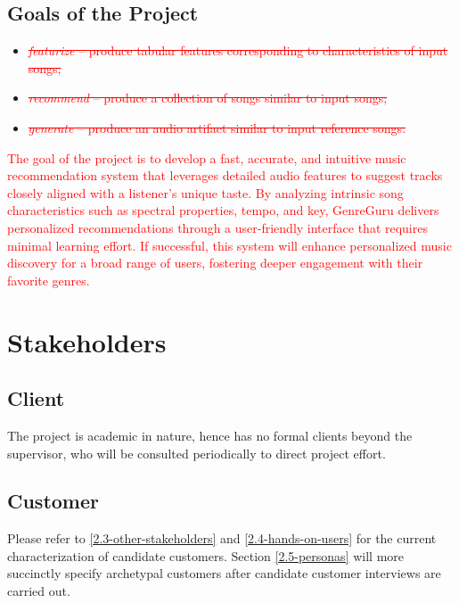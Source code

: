\documentclass[12pt]{article}
\begin{document}
\subsection{Goals of the Project}

\begin{itemize}
  \item \textcolor{red}{\sout{\emph{featurize} -- produce tabular features corresponding to characteristics of input songs;}}
  \item \textcolor{red}{\sout{\emph{recommend} -- produce a collection of songs similar to input songs;}}
  \item \textcolor{red}{\sout{\emph{generate} -- produce an audio artifact similar to input reference songs.}}  
\end{itemize}


\textcolor{red}{The goal of the project is to develop a fast, accurate, and intuitive music recommendation system that leverages detailed audio features to suggest 
tracks closely aligned with a listener’s unique taste. By analyzing intrinsic song characteristics such as spectral properties, tempo, and key, 
GenreGuru delivers personalized recommendations through a user-friendly interface that requires minimal learning effort. 
If successful, this system will enhance personalized music discovery for a broad range of users, fostering deeper engagement with their 
favorite genres.}

\section{Stakeholders}
\subsection{Client} \label{2.1-client}
The project is academic in nature, hence has no formal clients beyond the supervisor, who will be consulted periodically to direct project effort.
\subsection{Customer} \label{2.2-customer}
Please refer to \ref{2.3-other-stakeholders} and \ref{2.4-hands-on-users} for the current characterization of candidate customers. Section \ref{2.5-personas} will more succinctly specify archetypal customers after candidate customer interviews are carried out.
\end{document}
